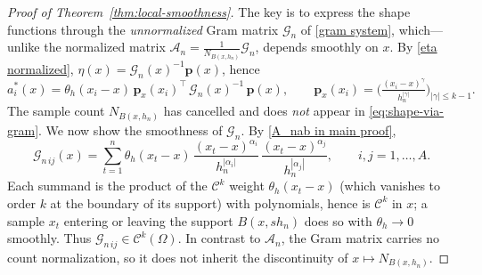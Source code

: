 \documentclass{article}
\begin{document}
\begin{proof}[Proof of Theorem~\ref{thm:local-smoothness}]
The key is to express the shape functions through the \emph{unnormalized} Gram matrix
$\mathscr{G}_n$ of \eqref{gram system}, which---unlike the normalized matrix
$\mathscr{A}_n=\tfrac{1}{N_{B(x,h_n)}}\mathscr{G}_n$, depends smoothly on $x$. By
\eqref{eta normalized}, $\eta(x)=\mathscr{G}_n(x)^{-1}\boldsymbol{p}(x)$, hence
\begin{equation}
a_i^*(x)=\theta_h(x_i-x)\,\boldsymbol{p}_x(x_i)^\top\,\mathscr{G}_n(x)^{-1}\,\boldsymbol{p}(x),
\qquad
\boldsymbol{p}_x(x_i)=\Big(\tfrac{(x_i-x)^\gamma}{h_n^{|\gamma|}}\Big)_{|\gamma|\le k-1}.
\label{eq:shape-via-gram}
\end{equation}
The sample count $N_{B(x,h_n)}$ has cancelled and does \emph{not} appear in \eqref{eq:shape-via-gram}.
We now show the smoothness of $\mathscr{G}_n$.
By \eqref{A_nab in main proof},
$$
\mathscr{G}_{n\,ij}(x)=\sum_{t=1}^n \theta_h(x_t-x)\,
\frac{(x_t-x)^{\alpha_i}}{h_n^{|\alpha_i|}}\,\frac{(x_t-x)^{\alpha_j}}{h_n^{|\alpha_j|}},
\qquad i,j=1,\dots,A .
$$
Each summand is the product of the $\mathcal{C}^k$ weight $\theta_h(x_t-x)$ (which
vanishes to order $k$ at the boundary of its support) with polynomials, hence is
$\mathcal{C}^k$ in $x$; a sample $x_t$ entering or leaving the support $B(x,sh_n)$ does so
with $\theta_h\to 0$ smoothly. Thus $\mathscr{G}_{n\,ij}\in\mathcal{C}^k(\Omega)$. In
contrast to $\mathscr{A}_n$, the Gram matrix carries no count normalization, so it does not inherit the discontinuity of $x\mapsto N_{B(x,h_n)}$.


\end{proof}
\end{document}

